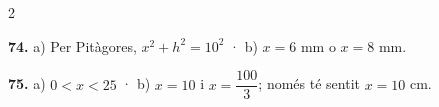 \documentclass[13pt,a4paper]{extarticle}
\begin{document}
\begin{multicols}{2}
\par\noindent\begin{minipage}{\linewidth}
\textbf{74.} a) Per Pitàgores, $x^2+h^2=10^2$ · b) $x=6$ mm o $x=8$ mm.\par
\end{minipage}\par\vspace{1.6mm}
\par\noindent\begin{minipage}{\linewidth}
\textbf{75.} a) $0<x<25$ · b) $x=10$ i $x=\dfrac{100}{3}$; només té sentit $x=10$ cm.\par
\end{minipage}\par\vspace{1.6mm}
\end{multicols}
\end{document}
